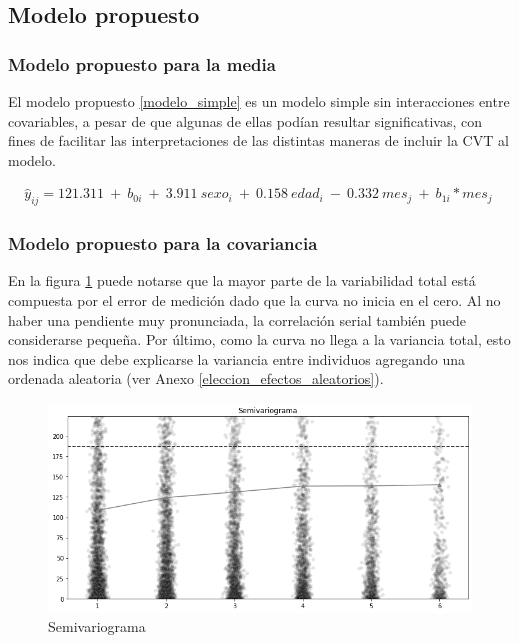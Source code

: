 \documentclass[spanish]{article}
\numberwithin{figure}{subsection}
\numberwithin{equation}{subsection}
\numberwithin{table}{subsection}
\begin{document}
\subsection{Modelo propuesto}

\subsubsection{Modelo propuesto para la media}

El modelo propuesto \ref{modelo_simple} es un modelo simple sin interacciones
entre covariables, a pesar de que algunas de ellas podían resultar
significativas, con fines de facilitar las interpretaciones de las distintas
maneras de incluir la CVT al modelo.

\begin{multline}
	\label{modelo_simple}
	\hat{y}_{ij} = 121.311\ +\ b_{0i}\ +\ 3.911\ sexo_i\ +\ 0.158\ edad_i\
	-\ 0.332\ mes_j\ +\ b_{1i}*mes_j\
\end{multline}

\subsubsection{Modelo propuesto para la covariancia}

En la figura \ref{semivariogram} puede notarse que la mayor parte de la
variabilidad total está compuesta por el error de medición dado que la curva no
inicia en el cero. Al no haber una pendiente muy pronunciada, la correlación
serial también puede considerarse pequeña. Por último, como la curva no llega a
la variancia total, esto nos indica que debe explicarse la variancia entre
individuos agregando una ordenada aleatoria (ver Anexo
\ref{eleccion_efectos_aleatorios}).


\begin{figure}[H]
	\centering
	\includegraphics[scale=0.4]{img/semivariogram.png}
	\caption{Semivariograma}
	\label{semivariogram}
\end{figure}
\end{document}
